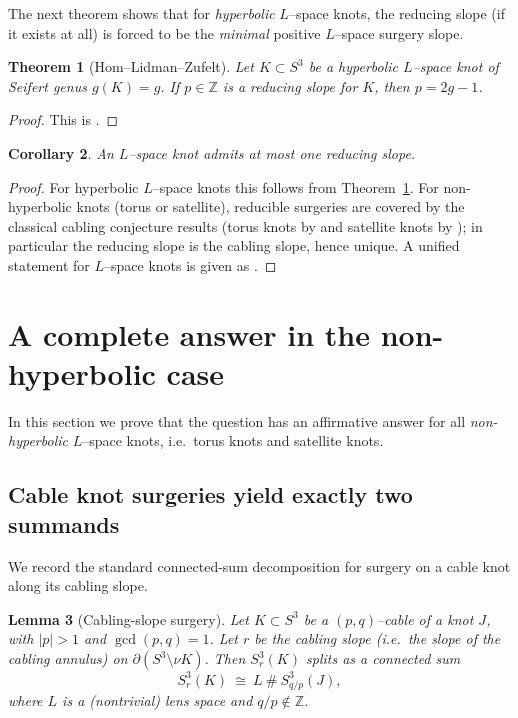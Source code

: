 \documentclass[11pt]{amsart}
\newtheorem{theorem}{Theorem}[section]
\newtheorem{lemma}[theorem]{Lemma}
\newtheorem{corollary}[theorem]{Corollary}
\numberwithin{equation}{section}
\begin{document}
The next theorem shows that for \emph{hyperbolic} $L$--space knots, the reducing slope (if it exists at all) is
forced to be the \emph{minimal} positive $L$--space surgery slope.

\begin{theorem}[Hom--Lidman--Zufelt]\label{thm:HLZ}
Let $K\subset S^3$ be a hyperbolic $L$--space knot of Seifert genus $g(K)=g$.  If $p\in\mathbb{Z}$ is a reducing
slope for $K$, then $p=2g-1$.
\end{theorem}

\begin{proof}
This is \cite[Theorem~1.3]{HLZ15}.
\end{proof}

\begin{corollary}\label{cor:at-most-one-reducing-slope}
An $L$--space knot admits at most one reducing slope.
\end{corollary}

\begin{proof}
For hyperbolic $L$--space knots this follows from Theorem~\ref{thm:HLZ}.
For non-hyperbolic knots (torus or satellite), reducible surgeries are covered by the classical cabling
conjecture results (torus knots by \cite{Moser71} and satellite knots by \cite{Schar90}); in particular the
reducing slope is the cabling slope, hence unique.  A unified statement for $L$--space knots is given as
\cite[Corollary~1.4]{HLZ15}.
\end{proof}

\section{A complete answer in the non-hyperbolic case}

In this section we prove that the question has an affirmative answer for all \emph{non-hyperbolic} $L$--space
knots, i.e.\ torus knots and satellite knots.

\subsection{Cable knot surgeries yield exactly two summands}

We record the standard connected-sum decomposition for surgery on a cable knot along its cabling slope.

\begin{lemma}[Cabling-slope surgery]\label{lem:cable-slope}
Let $K\subset S^3$ be a $(p,q)$--cable of a knot $J$, with $|p|>1$ and $\gcd(p,q)=1$.
Let $r$ be the \emph{cabling slope} (i.e.\ the slope of the cabling annulus) on $\partial (S^3\setminus \nu K)$.
Then $S^3_r(K)$ splits as a connected sum
\[
  S^3_r(K)\ \cong\ L\ \#\ S^3_{q/p}(J),
\]
where $L$ is a (nontrivial) lens space and $q/p\notin\mathbb{Z}$.
\end{lemma}
\end{document}
